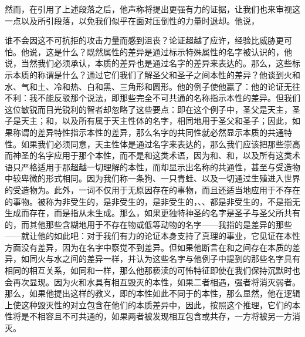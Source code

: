 然而，在引用了上述段落之后，他声称将提出更强有力的证据，让我们也来审视这一点以及所引段落，以免我们似乎在面对压倒性的力量时退却。他说，\par

谁不会因这不可抗拒的攻击力量而感到沮丧？论证超越了应许，经验比威胁更可怕。他说，这是什么？既然属性的差异是通过标示特殊属性的名字被认识的，他说，当然我们必须承认，本质的差异也是通过名字的差异来表达的。那么，这些标示本质的称谓是什么？通过它们我们了解圣父和圣子之间本性的差异？他谈到火和水、气和土、冷和热、白和黑、三角形和圆形。他的例子使他赢了：他的论证无往不利：我不能反驳那个说法，即那些完全不可共通的名称指示本性的差异。但我们这位敏锐而目光锐利的智者却忽略了这些要点：即在这个例子中，圣父是天主，圣子是天主；和，以及所有属于天主性体的名字，相同地用于圣父和圣子；因此，如果称谓的差异特性指示本性的差异，那么名字的共同性就必然显示本质的共通特性。如果我们必须同意，天主性体是通过名字来表达的，那么我们应该把那些崇高而神圣的名字应用于那个本性，而不是和这类术语，因为和、和，以及所有这类术语只严格适用于那超越一切理解的本性，而却显示出名称的共通性，甚至与受造物中较卑微的形式相同。因为我们称一条狗、一只青蛙、以及一切通过生殖进入世界的受造物为。此外，一词不仅用于无原因存在的事物，而且还适当地应用于不存在的事物。被称为非受生的，是非受生的，是非受生的，、、都是非受生的，不是指无生成而存在，而是指从未生成。那么，如果更独特神圣的名字是圣子与圣父所共有的，而其他那些含糊地用于不存在物或低等动物的名字——我指的是差异的那些——就让他的如此吧：对于我们有力的论证本身支持了真理的事业，它见证在本性方面没有差异，因为在名字中察觉不到差异。但如果他断言在和之间存在本质的差异，如同火与水之间的差异一样，并认为这些名字与他例子中提到的那些名字具有相同的相互关系，如同和一样，那么他那亵渎的可怖特征即使在我们保持沉默时也会再次显现。因为火和水具有相互毁灭的本性，如果二者相遇，强者将消灭弱者。那么，如果他提出这样的教义，即的本性如此不同于的本性，那么显然，他在逻辑上使这种毁灭性的对立包含在他们的本质差异中，因此，按照这个推理，它们的本性将是不相容且不可共通的，如果两者被发现相互包含或共存，一方将被另一方消灭。\par

